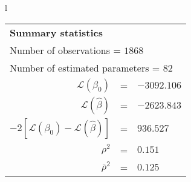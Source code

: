 \begin{tabular}{l}
\begin{tabular}{rcl}
\multicolumn{3}{l}{\bf Summary statistics}\\
\multicolumn{3}{l}{ Number of observations = $1868$} \\
\multicolumn{3}{l}{ Number of estimated  parameters = $82$} \\
 $\mathcal{L}(\beta_0)$ &=&  $-3092.106$ \\
 $\mathcal{L}(\hat{\beta})$ &=& $-2623.843 $  \\
 $-2[\mathcal{L}(\beta_0) -\mathcal{L}(\hat{\beta})]$ &=& $936.527$ \\
    $\rho^2$ &=&   $0.151$ \\
    $\bar{\rho}^2$ &=&    $0.125$ \\
\end{tabular}
  \end{tabular}
